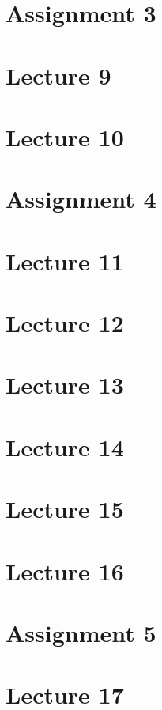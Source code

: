 \documentclass[12 pt, a4paper, toc=graduated, oneside]{book}
\begin{document}
\chapter*{Assignment 3}\label{assign:3}

%
\chapter{Lecture 9}\label{lec:9}

%
\chapter{Lecture 10}

%
\chapter*{Assignment 4}\label{assign:4}

%
\chapter{Lecture 11}

%
\chapter{Lecture 12}

%
\chapter{Lecture 13}

%
\chapter{Lecture 14}

%
\chapter{Lecture 15}

%
\chapter{Lecture 16}

%
\chapter*{Assignment 5}\label{assign:5}

%
\chapter{Lecture 17}

%
\end{document}
